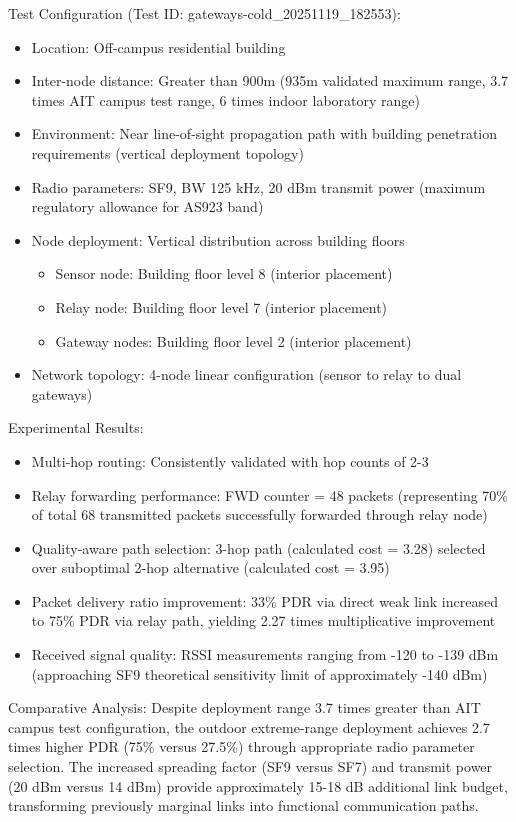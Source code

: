 Test Configuration (Test ID: gateways-cold\_20251119\_182553):
\begin{itemize}
\item Location: Off-campus residential building
\item Inter-node distance: Greater than 900m (935m validated maximum range, 3.7 times AIT campus test range, 6 times indoor laboratory range)
\item Environment: Near line-of-sight propagation path with building penetration requirements (vertical deployment topology)
\item Radio parameters: SF9, BW 125 kHz, 20 dBm transmit power (maximum regulatory allowance for AS923 band)
\item Node deployment: Vertical distribution across building floors
  \begin{itemize}
  \item Sensor node: Building floor level 8 (interior placement)
  \item Relay node: Building floor level 7 (interior placement)
  \item Gateway nodes: Building floor level 2 (interior placement)
  \end{itemize}
\item Network topology: 4-node linear configuration (sensor to relay to dual gateways)
\end{itemize}

Experimental Results:
\begin{itemize}
\item Multi-hop routing: Consistently validated with hop counts of 2-3
\item Relay forwarding performance: FWD counter = 48 packets (representing 70\% of total 68 transmitted packets successfully forwarded through relay node)
\item Quality-aware path selection: 3-hop path (calculated cost = 3.28) selected over suboptimal 2-hop alternative (calculated cost = 3.95)
\item Packet delivery ratio improvement: 33\% PDR via direct weak link increased to 75\% PDR via relay path, yielding 2.27 times multiplicative improvement
\item Received signal quality: RSSI measurements ranging from -120 to -139 dBm (approaching SF9 theoretical sensitivity limit of approximately -140 dBm)
\end{itemize}

Comparative Analysis: Despite deployment range 3.7 times greater than AIT campus test configuration, the outdoor extreme-range deployment achieves 2.7 times higher PDR (75\% versus 27.5\%) through appropriate radio parameter selection. The increased spreading factor (SF9 versus SF7) and transmit power (20 dBm versus 14 dBm) provide approximately 15-18 dB additional link budget, transforming previously marginal links into functional communication paths.

